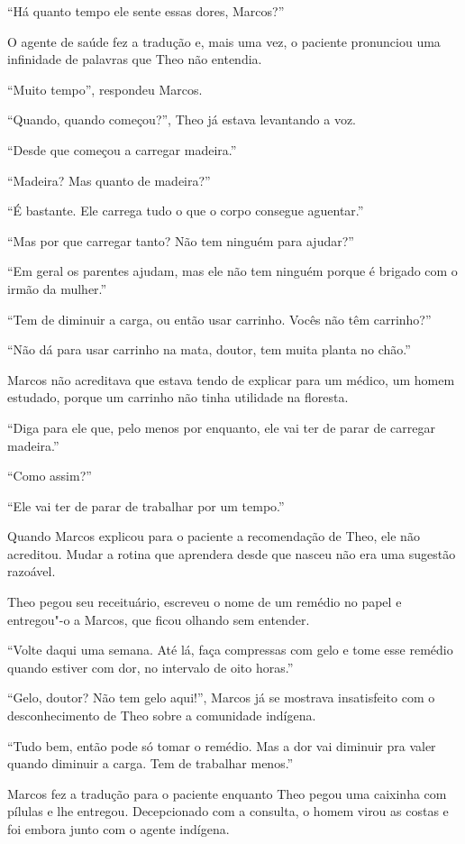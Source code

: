 ``Há quanto tempo ele sente essas dores, Marcos?''

O agente de saúde fez a tradução e, mais uma vez, o paciente pronunciou
uma infinidade de palavras que Theo não entendia.

``Muito tempo'', respondeu Marcos.

``Quando, quando começou?'', Theo já estava levantando a voz.

``Desde que começou a carregar madeira.''

``Madeira? Mas quanto de madeira?''

``É bastante. Ele carrega tudo o que o corpo consegue aguentar.''

``Mas por que carregar tanto? Não tem ninguém para ajudar?''

``Em geral os parentes ajudam, mas ele não tem ninguém porque é brigado
com o irmão da mulher.''

``Tem de diminuir a carga, ou então usar carrinho. Vocês não têm
carrinho?''

``Não dá para usar carrinho na mata, doutor, tem muita planta no chão.''

Marcos não acreditava que estava tendo de explicar para um médico, um
homem estudado, porque um carrinho não tinha utilidade na floresta.

``Diga para ele que, pelo menos por enquanto, ele vai ter de parar de
carregar madeira.''

``Como assim?''

``Ele vai ter de parar de trabalhar por um tempo.''

Quando Marcos explicou para o paciente a recomendação de Theo, ele não
acreditou. Mudar a rotina que aprendera desde que nasceu não era uma
sugestão razoável.

Theo pegou seu receituário, escreveu o nome de um remédio no papel e
entregou"-o a Marcos, que ficou olhando sem entender.

``Volte daqui uma semana. Até lá, faça compressas com gelo e tome esse
remédio quando estiver com dor, no intervalo de oito horas.''

``Gelo, doutor? Não tem gelo aqui!'', Marcos já se mostrava insatisfeito
com o desconhecimento de Theo sobre a comunidade indígena.

``Tudo bem, então pode só tomar o remédio. Mas a dor vai diminuir pra
valer quando diminuir a carga. Tem de trabalhar menos.''

Marcos fez a tradução para o paciente enquanto Theo pegou uma caixinha
com pílulas e lhe entregou. Decepcionado com a consulta, o homem virou
as costas e foi embora junto com o agente indígena.


